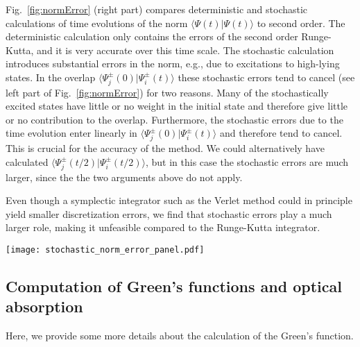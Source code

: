 Fig.~\ref{fig:normError} (right part) compares deterministic\cite{PHC2012,BSKS2015} and 
stochastic calculations of time evolutions of the norm $\langle \Psi(t)|\Psi(t)\rangle$
to second order.  The deterministic calculation only contains the errors of the second 
order Runge-Kutta, and it is very accurate over this time scale.  The stochastic calculation 
introduces substantial errors in the norm, e.g., due to excitations to high-lying states. 
In the overlap $\langle \Psi_j^{\pm}(0)|\Psi^{\pm}_i(t)\rangle$ these stochastic errors tend 
to cancel (see left part of Fig.~\ref{fig:normError}) for two reasons. Many of the stochastically 
excited states have little or no weight in the initial state and therefore give little 
or no contribution to the overlap. Furthermore, the stochastic errors due to the time evolution 
enter linearly in $\langle \Psi_j^{\pm}(0)|\Psi^{\pm}_i(t)\rangle$ and therefore tend to cancel. 
This is crucial for the accuracy of the method. 
We could alternatively have calculated $\langle\Psi_j^{\pm}(t/2)| \Psi^{\pm}_i(t/2)\rangle$, but 
in this case the stochastic errors are much larger, since the the two arguments above do not apply.   

Even though a symplectic integrator such as the Verlet method \cite{Verlet} could in
principle yield smaller discretization errors, we find that stochastic errors
play a much larger role, making it unfeasible compared to the
Runge-Kutta integrator.

\begin{figure*}[t]
\texttt{[image: stochastic\_norm\_error\_panel.pdf]}

\caption{Green's function (left) and norm (right) of the wave function over time  
using the second-order algorithm for the two-dimensional 10-site Hubbard model, 
$k=(0,0)$ and $U/t=1$. Both were calculated using both stochastic and deterministic algorithms.}
\label{fig:normError}
\end{figure*}

\subsection{Computation of Green's functions and optical absorption}
Here, we provide some more details about the calculation of the Green's function.


